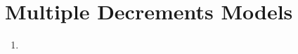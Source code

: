 \section{Multiple Decrements Models}
\label{sect:mult-decr-models}
\begin{enumerate}
\item 
\end{enumerate}
